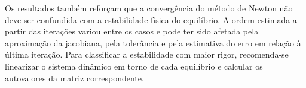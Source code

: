 \documentclass[
	12pt,				%
	oneside,			%
	a4paper,			%
	]{article}
\begin{document}
    Os resultados também reforçam que a convergência do método de Newton não deve ser confundida com a estabilidade física do equilíbrio. A ordem estimada a partir das iterações variou entre os casos e pode ter sido afetada pela aproximação da jacobiana, pela tolerância e pela estimativa do erro em relação à última iteração. Para classificar a estabilidade com maior rigor, recomenda-se linearizar o sistema dinâmico em torno de cada equilíbrio e calcular os autovalores da matriz correspondente.

    \printbibliography
\end{document}
